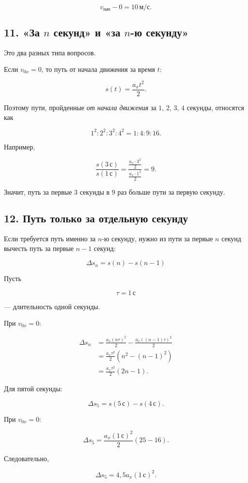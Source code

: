 \documentclass[a4paper,12pt]{article}
\newcommand{\ms}{\,\text{м/с}}
\newcommand{\formula}[1]{\[\boxed{#1}\]}
\begin{document}
\[
v_{\text{нач}}-0=10\ms.
\]

\subsection*{11. «За $n$ секунд» и «за $n$-ю секунду»}

Это два разных типа вопросов.

Если $v_{0x}=0$, то путь от начала движения за время $t$:

\[
s(t)=\frac{a_xt^2}{2}.
\]

Поэтому пути,
пройденные \emph{от начала движения}
за $1$, $2$, $3$, $4$ секунды,
относятся как

\[
1^2:2^2:3^2:4^2
=
1:4:9:16.
\]

Например,

\[
\frac{s(3\,\text{с})}{s(1\,\text{с})}
=
\frac{\frac{a_x\cdot3^2}{2}}
{\frac{a_x\cdot1^2}{2}}
=
9.
\]

Значит, путь за первые $3$ секунды
в $9$ раз больше пути за первую секунду.

\subsection*{12. Путь только за отдельную секунду}

Если требуется путь именно за $n$-ю секунду,
нужно из пути за первые $n$ секунд
вычесть путь за первые $n-1$ секунд:

\formula{\Delta s_n=s(n)-s(n-1)}

Пусть

\[
\tau=1\,\text{с}
\]

--- длительность одной секунды.

При $v_{0x}=0$:

\begin{align*}
\Delta s_n
&=
\frac{a_x(n\tau)^2}{2}
-
\frac{a_x((n-1)\tau)^2}{2}
\\[1mm]
&=
\frac{a_x\tau^2}{2}
\left(
n^2-(n-1)^2
\right)
\\[1mm]
&=
\frac{a_x\tau^2}{2}
(2n-1).
\end{align*}

Для пятой секунды:

\[
\Delta s_5
=
s(5\,\text{с})
-
s(4\,\text{с}).
\]

При $v_{0x}=0$:

\[
\Delta s_5
=
\frac{a_x(1\,\text{с})^2}{2}
(25-16).
\]

Следовательно,

\[
\Delta s_5
=
4{,}5a_x(1\,\text{с})^2.
\]
\end{document}
